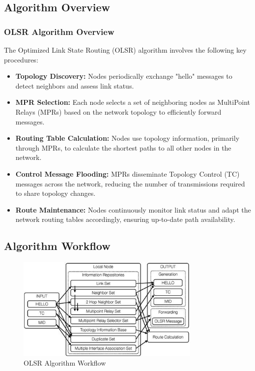 \documentclass[11pt]{beamer}              %
\begin{document}
\subsection{Algorithm Overview}
\begin{frame}
\frametitle{OLSR Algorithm Overview}

The Optimized Link State Routing (OLSR) algorithm involves the following key procedures:

\begin{itemize}
    \item \textbf{Topology Discovery:} Nodes periodically exchange "hello" messages to detect neighbors and assess link status.
    \item \textbf{MPR Selection:} Each node selects a set of neighboring nodes as MultiPoint Relays (MPRs) based on the network topology to efficiently forward messages.
    \item \textbf{Routing Table Calculation:} Nodes use topology information, primarily through MPRs, to calculate the shortest paths to all other nodes in the network.
    \item \textbf{Control Message Flooding:} MPRs disseminate Topology Control (TC) messages across the network, reducing the number of transmissions required to share topology changes.
    \item \textbf{Route Maintenance:} Nodes continuously monitor link status and adapt the network routing tables accordingly, ensuring up-to-date path availability.
\end{itemize}

\end{frame}

\subsection{Algorithm Workflow}
\begin{frame}
    \begin{figure}
        \centering
        \includegraphics[width=0.8\textwidth]{figures/olsr_overview.jpg}
        \caption{OLSR Algorithm Workflow \cite{wiki:olsr}}
    \end{figure}    
\end{frame}
\end{document}

